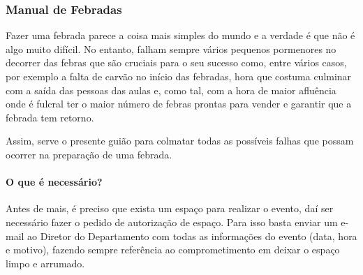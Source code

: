 
\subsubsection{Manual de Febradas}

Fazer uma febrada parece a coisa mais simples do mundo e a verdade é que não é algo muito difícil. No entanto, falham sempre vários pequenos pormenores no decorrer das febras que são cruciais para o seu sucesso como, entre vários casos, por exemplo a falta de carvão no início das febradas, hora que costuma culminar com a saída das pessoas das aulas e, como tal, com a hora de maior afluência onde é fulcral ter o maior número de febras prontas para vender e garantir que a febrada tem retorno.

Assim, serve o presente guião para colmatar todas as possíveis falhas que possam ocorrer na preparação de uma febrada.

\paragraph{O que é necessário?}
Antes de mais, é preciso que exista um espaço para realizar o evento, daí ser necessário fazer o pedido de autorização de espaço. Para isso basta enviar um e-mail ao Diretor do Departamento com todas as informações do evento (data, hora e motivo), fazendo sempre referência ao comprometimento em deixar o espaço limpo e arrumado.

